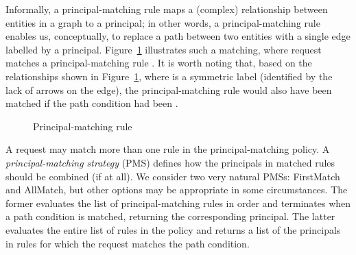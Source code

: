 \documentclass{article}
\begin{document}
Informally, a principal-matching rule maps a (complex) relationship between entities in a graph to a principal;
in other words, a principal-matching rule enables us, conceptually, to replace a path between two entities with a single edge labelled by a principal.
Figure~\ref{img:principal_matching_rule} illustrates such a matching, where request  matches a principal-matching rule . It is worth noting that, based on the relationships shown in Figure~\ref{img:principal_matching_rule}, where  is a symmetric label (identified by the lack of arrows on the edge), the principal-matching rule would also have been matched if the path condition had been .

\begin{figure}[!ht]\centering
    \caption{Principal-matching rule}\label{img:principal_matching_rule}
\end{figure}

A request may match more than one rule in the principal-matching policy.
A \emph{principal-matching strategy} (PMS) defines how the principals in matched rules should be combined (if at all).
We consider two very natural PMSs: \textsf{FirstMatch} and \textsf{AllMatch}, but other options may be appropriate in some circumstances.
The former evaluates the list of principal-matching rules in order and terminates when a path condition is matched, returning the corresponding principal.
The latter evaluates the entire list of rules in the policy and returns a list of the principals in rules for which the request matches the path condition.
\end{document}
